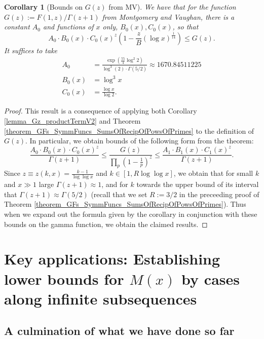 \documentclass[11pt,reqno,a4letter]{article}
\numberwithin{figure}{section}
\numberwithin{table}{section}
\theoremstyle{plain}
\newtheorem{cor}[theorem]{Corollary}
\numberwithin{theorem}{section}
\theoremstyle{definition}
\begin{document}
\begin{cor}[Bounds on $G(z)$ from MV] 
\label{cor_BoundsOnGz_FromMVBook_initial_stmt_v1} 
We have that for the function $G(z) := F(1, z) / \Gamma(z+1)$ from Montgomery and Vaughan, there 
is a constant $A_0$ and functions of $x$ only, $B_0(x), C_0(x)$, so that 
\[
A_0 \cdot B_0(x) \cdot C_0(x)^{z} \left(1 - \frac{z}{B} (\log x)^{\frac{1}{14}}\right) \leq G(z). 
\]
It suffices to take 
\begin{align*} 
A_0 & = \frac{\exp\left(\frac{55}{4} \log^2 2\right)}{\log^3(2) \cdot \Gamma(5/2)} 
     \approx 1670.84511225 \\ 
B_0(x) & = \log^3 x \\ 
C_0(x) & = \frac{\log x}{\log 2}. 
\end{align*} 
\end{cor}
\begin{proof} 
This result is a consequence of applying both 
Corollary \ref{lemma_Gz_productTermV2} and 
Theorem \ref{theorem_GFs_SymmFuncs_SumsOfRecipOfPowsOfPrimes} to the definition of $G(z)$. 
In particular, we obtain bounds of the following form from the theorem: 
\[
\frac{A_0 \cdot B_0(x) \cdot C_0(x)^{z}}{\Gamma(z+1)} \leq 
     \frac{G(z)}{\prod_p \left(1-\frac{1}{p}\right)^{z}} \leq 
     \frac{A_1 \cdot B_1(x) \cdot C_1(x)^{z}}{\Gamma(z+1)}. 
\]
Since $z \equiv z(k, x) = \frac{k-1}{\log\log x}$ and $k \in [1, R\log\log x]$, we obtain that 
for small $k$ and $x \gg 1$ large $\Gamma(z+1) \approx 1$, and for $k$ towards the upper bound of 
its interval that $\Gamma(z+1) \approx \Gamma(5/2)$ (recall that we set $R := 3/2$ in the 
preceeding proof of Theorem \ref{theorem_GFs_SymmFuncs_SumsOfRecipOfPowsOfPrimes}). 
Thus when we expand out the formula given by the corollary in conjunction with these bounds on the 
gamma function, we obtain the claimed results. 
\end{proof} 

\newpage
\section{Key applications: Establishing lower bounds for $M(x)$ by cases along infinite subsequences} 

\subsection{A culmination of what we have done so far} 
\end{document}
